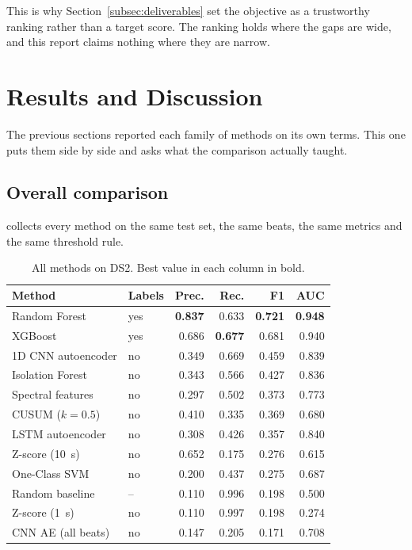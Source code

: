 \documentclass[a4paper, 12pt]{article}
\begin{document}
This is why Section~\ref{subsec:deliverables} set the objective as a trustworthy
ranking rather than a target score. The ranking holds where the gaps are wide, and
this report claims nothing where they are narrow.



\section{Results and Discussion} \label{sec:results}

The previous sections reported each family of methods on its own terms. This one
puts them side by side and asks what the comparison actually taught.

\subsection{Overall comparison} \label{subsec:overall}

 collects every method on the same test set, the same beats, the
same metrics and the same threshold rule.

\begin{table}[htbp]
  \centering
  \small
  \caption{All methods on DS2. Best value in each column in bold.}
  \label{tab:final}
  \begin{tabular}{@{}llrrrr@{}}
    \toprule
    \textbf{Method} & \textbf{Labels} & \textbf{Prec.} & \textbf{Rec.}
      & \textbf{F1} & \textbf{AUC} \\
    \midrule
    Random Forest        & yes & \textbf{0.837} & 0.633 & \textbf{0.721} & \textbf{0.948} \\
    XGBoost              & yes & 0.686 & \textbf{0.677} & 0.681 & 0.940 \\
    1D CNN autoencoder   & no  & 0.349 & 0.669 & 0.459 & 0.839 \\
    Isolation Forest     & no  & 0.343 & 0.566 & 0.427 & 0.836 \\
    Spectral features    & no  & 0.297 & 0.502 & 0.373 & 0.773 \\
    CUSUM ($k=0.5$)      & no  & 0.410 & 0.335 & 0.369 & 0.680 \\
    LSTM autoencoder     & no  & 0.308 & 0.426 & 0.357 & 0.840 \\
    Z-score (\SI{10}{\second}) & no & 0.652 & 0.175 & 0.276 & 0.615 \\
    One-Class SVM        & no  & 0.200 & 0.437 & 0.275 & 0.687 \\
    Random baseline      & --  & 0.110 & 0.996 & 0.198 & 0.500 \\
    Z-score (\SI{1}{\second}) & no & 0.110 & 0.997 & 0.198 & 0.274 \\
    CNN AE (all beats)   & no  & 0.147 & 0.205 & 0.171 & 0.708 \\
    \bottomrule
  \end{tabular}
\end{table}
\end{document}
